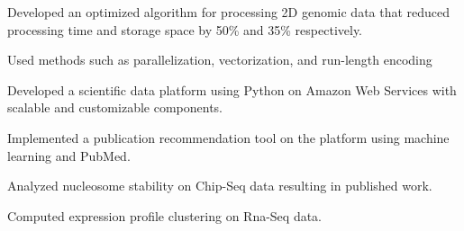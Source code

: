 \documentclass[letterpaper]{resume} %
\begin{document}
\vspace{2 mm}
\hfill
{}
\hfill
{}
\vspace{1 mm}
\begin{tightitemize}
	\item Developed an optimized algorithm for processing 2D genomic data that reduced processing time and storage space by 50\% and 35\% respectively.
	\item Used methods such as parallelization, vectorization, and run-length encoding
\end{tightitemize}
\vspace{2 mm}
\hfill
{}
\hfill
{}
\vspace{1 mm}
\begin{tightitemize}
	\item Developed a scientific data platform using Python on Amazon Web Services with scalable and customizable components.
	\item Implemented a publication recommendation tool on the platform using machine learning and PubMed.
\end{tightitemize}
\vspace{2 mm}
\hfill
{}
\hfill
{}
\vspace{1 mm}
\begin{tightitemize}
	\item Analyzed nucleosome stability on Chip-Seq data resulting in published work.
	\item Computed expression profile clustering on Rna-Seq data.
\end{tightitemize}
\end{document}

